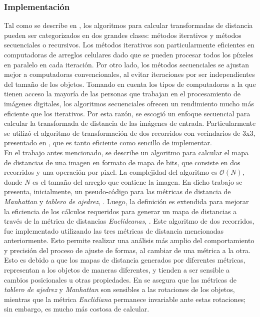 \subsubsection*{Implementaci\'on}
\label{sec:dtimp}

Tal como se describe en \cite[p.196]{fastdt}, los algoritmos para calcular transformadas de distancia pueden ser
categorizados en dos grandes clases: m\'etodos iterativos y m\'etodos secuenciales o recursivos. 
Los m\'etodos iterativos son particularmente eficientes en computadoras de arreglos celulares
dado que se pueden procesar todos los p\'ixeles en paralelo en cada iteraci\'on. Por otro lado, los m\'etodos secuenciales
se ajustan mejor a computadoras convencionales, al evitar iteraciones por ser independientes del tama\~no de los objetos.
Tomando en cuenta los tipos de computadoras a la que tienen acceso la mayor\'ia de las personas que trabajan
en el procesamiento de im\'agenes digitales, los algoritmos secuenciales ofrecen un rendimiento mucho m\'as
eficiente que los iterativos. Por esta raz\'on, se escogi\'o un enfoque secuencial para calcular la 
transformada de distancia de las im\'agenes de entrada. Particularmente se utiliz\'o el algoritmo de
transformaci\'on de dos recorridos con vecindarios de 3x3, presentado en \cite{fastdt}, que es
tanto eficiente como sencillo de implementar.\\

En el trabajo antes mencionado, se describe un algoritmo para calcular el mapa 
de distancias de una imagen en formato de mapa de bits, que consiste en dos recorridos y
una operaci\'on por pixel. La complejidad del algoritmo es $\mathcal{O}(N)$, donde $N$ 
es el tama\~no del arreglo que contiene la imagen.
En dicho trabajo se presenta, inicialmente, un pseudo-c\'odigo para las m\'etricas 
de distancia de \emph{Manhattan} y \emph{tablero de ajedrez}, \cite[p.197]{fastdt}.
Luego, la definici\'on es extendida para mejorar la eficiencia de los c\'alculos 
requeridos para generar un mapa de distancias a trav\'es de la m\'etrica de distancias
\emph{Euclideanas}, \cite[p.198]{fastdt}.
Este algoritmo de dos recorridos, fue implementado utilizando las tres m\'etricas de
distancia mencionadas anteriormente. Esto permite realizar una an\'alisis m\'as amplio
del comportamiento y precisi\'on del proceso de ajuste de formas, al cambiar de
una m\'etrica a la otra. Esto es debido a que los mapas de distancia generados por 
diferentes m\'etricas, representan a los objetos de maneras diferentes, y tienden
a ser sensible a cambios posicionales u otras propiedades. En \cite[p.332]{eucskeleton}
se asegura que las m\'etricas de \emph{tablero de ajedrez} y \emph{Manhattan} son
sensibles a las rotaciones de los objetos, mientras que la m\'etrica \emph{Euclidiana}
permanece invariable ante estas rotaciones; sin embargo, es mucho m\'as costosa de calcular.\\

